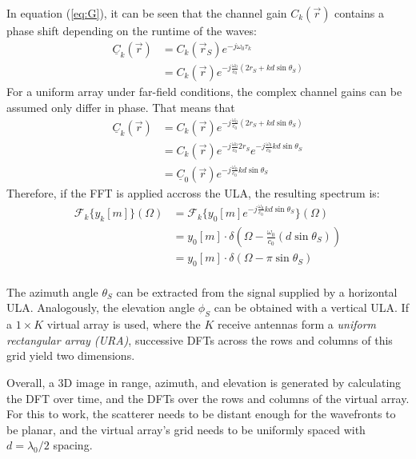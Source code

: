 In equation (\ref{eq:G}), it can be seen that the channel gain $C_k(\vec r)$
contains a phase shift depending on the runtime of the waves:
\begin{align}
    \underline{C}_k(\vec r) & = C_k(\vec r_S)e^{-j\omega_0\tau_k}                            \\
                            & = C_k(\vec r)e^{-j\frac{\omega_0}{c_0}(2r_S + kd\sin\theta_S)}
\end{align}
For a uniform array under far-field conditions,
the complex channel gains can be assumed only differ in phase. That means that
\begin{align}
    \underline{C}_k(\vec r) & = C_k(\vec r)e^{-j\frac{\omega_0}{c_0}(2r_S + kd\sin\theta_S)}                      \\
                            & = C_k(\vec r)e^{-j\frac{\omega_0}{c_0}2r_S}e^{-j\frac{\omega_0}{c_0}kd\sin\theta_S} \\
                            & = \underline C_0(\vec r)e^{-j\frac{\omega_0}{c_0}kd\sin\theta_S}
\end{align}
Therefore, if the FFT is applied accross the ULA, the resulting spectrum is:
\begin{align}
    \mathcal{F}_k\{y_k[m]\}(\Omega) & = \mathcal{F}_k\{y_0[m]e^{-j \frac{\omega_0}{c_0}kd\sin\theta_S}\}(\Omega)      \\
                                    & = y_0[m] \cdot \delta \left(\Omega -\frac{\omega_0}{c_0}(d\sin\theta_S) \right) \\
                                    & = y_0[m] \cdot \delta \left(\Omega - \pi\sin\theta_S \right)                    \\
\end{align}

The azimuth angle $\theta_S$ can be extracted from the signal supplied by a horizontal ULA.
Analogously, the elevation angle $\phi_S$ can be obtained with a vertical ULA.
If a $1\times K$ virtual array is used, where the $K$ receive antennas form a \emph{uniform rectangular array (URA)},
successive DFTs across the rows and columns of this grid yield two dimensions.

Overall, a 3D image in range, azimuth, and elevation is generated
by calculating the DFT over time, and the DFTs over the rows and columns of the virtual array.
For this to work, the scatterer needs to be distant enough for the wavefronts to be planar,
and the virtual array's grid needs to be uniformly spaced with $d=\lambda_0/2$ spacing.

